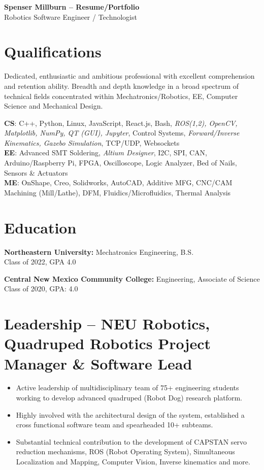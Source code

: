 \documentclass[11pt,a4paper]{article}
\newcommand{\header}[2]{
  \begin{center}
    \Huge \textbf{#1}\\
    \large #2
  \end{center}
}
\newcommand{\qualificationarea}[2]{
  \textbf{#1}: #2\\
}
\begin{document}
\header{Spenser Millburn -- Resume/Portfolio}{Robotics Software Engineer / Technologist}

\section*{Qualifications}
Dedicated, enthusiastic and ambitious professional with excellent comprehension and retention ability. Breadth and depth knowledge in a broad spectrum of technical fields concentrated within Mechatronics/Robotics, EE, Computer Science and Mechanical Design.

\qualificationarea{CS}{C++, Python, Linux, JavaScript, React.js, Bash, \textit{ROS(1,2), OpenCV, Matplotlib, NumPy, QT (GUI), Jupyter}, Control Systems, \textit{Forward/Inverse Kinematics, Gazebo Simulation}, TCP/UDP, Websockets}

\qualificationarea{EE}{Advanced SMT Soldering, \textit{Altium Designer}, I2C, SPI, CAN, Arduino/Raspberry Pi, FPGA, Oscilloscope, Logic Analyzer, Bed of Nails, Sensors \& Actuators}

\qualificationarea{ME}{OnShape, Creo, Solidworks, AutoCAD, Additive MFG, CNC/CAM Machining (Mill/Lathe), DFM, Fluidics/Microfluidics, Thermal Analysis}

\section*{Education}
\textbf{Northeastern University:} Mechatronics Engineering, B.S.\\
Class of 2022, GPA 4.0

\textbf{Central New Mexico Community College:} Engineering, Associate of Science\\
Class of 2020, GPA: 4.0

\section*{Leadership -- NEU Robotics, Quadruped Robotics Project Manager \& Software Lead}
\begin{itemize}
\item Active leadership of multidisciplinary team of 75+ engineering students working to develop advanced quadruped (Robot Dog) research platform.
\item Highly involved with the architectural design of the system, established a cross functional software team and spearheaded 10+ subteams.
\item Substantial technical contribution to the development of CAPSTAN servo reduction mechanisms, ROS (Robot Operating System), Simultaneous Localization and Mapping, Computer Vision, Inverse kinematics and more.
\end{itemize}
\end{document}
